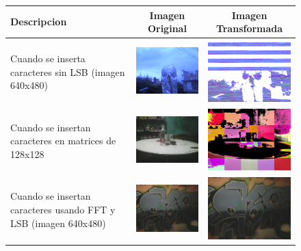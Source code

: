 \documentclass[12pt]{article}
\begin{document}
\begin{figure}[hbtp]
\centering
\begin{tabular}{|p{3cm}|c|c|}
\hline
Descripcion & Imagen Original & Imagen Transformada\\
\hline
Cuando se inserta caracteres sin LSB (imagen 640x480) & \includegraphics[width = 5cm]{hip0.png} & \includegraphics[width = 5cm]{hip1.png} \\
\hline
Cuando se insertan caracteres en matrices de 128x128 & \includegraphics[width = 5cm]{flaw0.png} & \includegraphics[width = 5cm]{flaw1.png} \\
\hline
Cuando se insertan caracteres usando FFT y LSB (imagen 640x480) & \includegraphics[width = 5cm]{chois0.png} & \includegraphics[width = 5cm]{chois3.png} \\

\end{tabular}
\end{figure}
\end{document}
